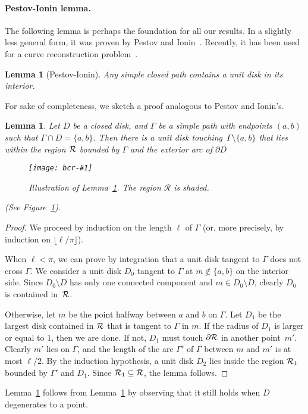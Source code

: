 \documentclass[a4paper]{article}
\newcommand{\bd}{\partial}
\newtheorem{lemma}[theorem]{Lemma}
\newcommand{\epsfigure}[2]{
  \begin{figure}[htb]
    \centerline{\texttt{[image: bcr-\#1]}}
    \caption{#2}
    \label{f:#1}
  \end{figure}}
\begin{document}
\paragraph{Pestov-Ionin lemma.}

The following lemma is perhaps the foundation for all our results.  In
a slightly less general form, it was proven by Pestov and
Ionin~\cite{pi-lpcigcc-59}.
Recently, it has been used for a curve 
reconstruction problem~\cite{gt-rcdc-05}. 
\begin{lemma}[Pestov-Ionin]\label{l:gPI}
  Any simple closed path contains a unit disk in its interior.
\end{lemma}
For sake of completeness, we sketch a proof analogous to
Pestov and Ionin's.
\begin{lemma}\label{l:ggPI}
  Let $D$ be a closed disk, and $\Gamma$ be a simple 
  path with endpoints $(a,b)$ such that $\Gamma \cap D=\{a,b\}$. 
  Then there is a unit disk touching~$\Gamma \setminus \{a,b\}$ that
  lies within the region $\cal R$ bounded by $\Gamma$ and the exterior
  arc of $\bd D$ 
\epsfigure{pestov}{Illustration of Lemma~\ref{l:ggPI}. The 
  region $\mathcal{R}$ is shaded.}
(See Figure~\ref{f:pestov}).
\end{lemma}
\begin{proof}
  We proceed by induction on the length $\ell$ of $\Gamma$ (or, more
  precisely, by induction on $\lfloor \ell/\pi \rfloor$).
  
  When $\ell < \pi$, we can prove by integration that a unit disk
  tangent to $\Gamma$ does not cross $\Gamma$. We consider a unit disk
  $D_0$ tangent to $\Gamma$ at $m \notin \{a,b\}$ on the interior
  side.  Since $D_0 \setminus D$ has only one connected component and
  $m \in D_0 \setminus D$, clearly $D_{0}$ is contained in~$\cal R$.
  
  Otherwise, let $m$ be the point halfway between $a$ and $b$ on
  $\Gamma$. Let $D_1$ be the largest disk contained in $\cal R$ that
  is tangent to $\Gamma$ in $m$.  If the radius of $D_1$ is larger or
  equal to $1$, then we are done.  If not, $D_{1}$ must touch
  $\bd {\cal R}$ in another point~$m'$.  Clearly $m'$ lies on
  $\Gamma$, and the length of the arc $\Gamma'$ of $\Gamma$ between
  $m$ and $m'$ is at most $\ell/2$.  By the induction hypothesis, a
  unit disk $D_{2}$ lies inside the region ${\cal R}_{1}$ bounded by
  $\Gamma'$ and $D_{1}$. Since ${\cal R}_{1} \subseteq {\cal R}$, the
  lemma follows.
\end{proof}
Lemma~\ref{l:gPI} follows from Lemma~\ref{l:ggPI} by observing that it
still holds when $D$ degenerates to a point.
\end{document}
